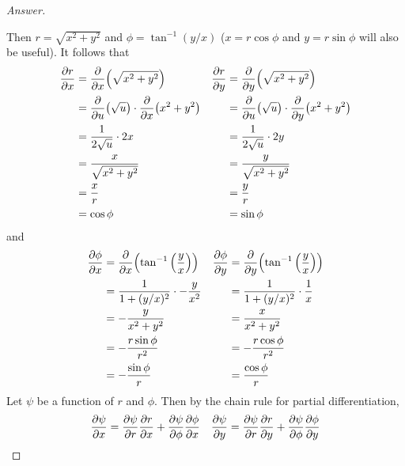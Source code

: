 \documentclass[../psets.tex]{subfiles}
\begin{document}
\begin{enumerate}
\begin{enumerate}
\begin{proof}[Answer]
\begin{center}
            \end{center}
            Then $r=\sqrt{x^2+y^2}$ and $\phi=\tan^{-1}(y/x)$ ($x=r\cos\phi$ and $y=r\sin\phi$ will also be useful). It follows that
            \begin{align*}
                \pdv{r}{x} &= \pdv{x}(\sqrt{x^2+y^2})&
                    \pdv{r}{y} &= \pdv{y}(\sqrt{x^2+y^2})\\
                &= \pdv{u}(\sqrt{u})\cdot\pdv{x}(x^2+y^2)&
                    &= \pdv{u}(\sqrt{u})\cdot\pdv{y}(x^2+y^2)\\
                &= \frac{1}{2\sqrt{u}}\cdot 2x&
                    &= \frac{1}{2\sqrt{u}}\cdot 2y\\
                &= \frac{x}{\sqrt{x^2+y^2}}&
                    &= \frac{y}{\sqrt{x^2+y^2}}\\
                &= \frac{x}{r}&
                    &= \frac{y}{r}\\
                &= \cos\phi&
                    &= \sin\phi
            \end{align*}
            and
            \begin{align*}
                \pdv{\phi}{x} &= \pdv{x}(\tan^{-1}\left( \frac{y}{x} \right))&
                    \pdv{\phi}{y} &= \pdv{y}(\tan^{-1}\left( \frac{y}{x} \right))\\
                &= \frac{1}{1+(y/x)^2}\cdot-\frac{y}{x^2}&
                    &= \frac{1}{1+(y/x)^2}\cdot\frac{1}{x}\\
                &= -\frac{y}{x^2+y^2}&
                    &= \frac{x}{x^2+y^2}\\
                &= -\frac{r\sin\phi}{r^2}&
                    &= -\frac{r\cos\phi}{r^2}\\
                &= -\frac{\sin\phi}{r}&
                    &= \frac{\cos\phi}{r}
            \end{align*}
            Let $\psi$ be a function of $r$ and $\phi$. Then by the chain rule for partial differentiation,
            \begin{align*}
                \pdv{\psi}{x} &= \pdv{\psi}{r}\pdv{r}{x}+\pdv{\psi}{\phi}\pdv{\phi}{x}&
                    \pdv{\psi}{y} &= \pdv{\psi}{r}\pdv{r}{y}+\pdv{\psi}{\phi}\pdv{\phi}{y}\\

\end{align*}
\end{proof}
\end{enumerate}
\end{enumerate}
\end{document}
